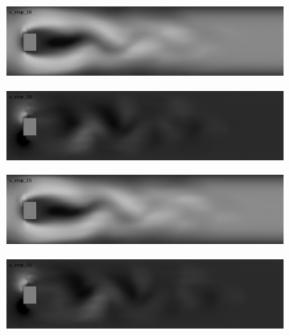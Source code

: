 \documentclass{llncs}
\begin{document}
\begin{figure}[H]
  \begin{subfigure}{.5\textwidth}
    \centering
    \includegraphics[width=1\linewidth]{imgs/sims/fluid/x_step_10}
  \end{subfigure}
  \begin{subfigure}{.5\textwidth}
    \centering
    \includegraphics[width=1\linewidth]{imgs/sims/fluid/y_step_10}
  \end{subfigure}

  \begin{subfigure}{.5\textwidth}
    \centering
    \includegraphics[width=1\linewidth]{imgs/sims/fluid/x_step_15}
  \end{subfigure}
  \begin{subfigure}{.5\textwidth}
    \centering
    \includegraphics[width=1\linewidth]{imgs/sims/fluid/y_step_15}
  \end{subfigure}



\end{figure}
\end{document}

